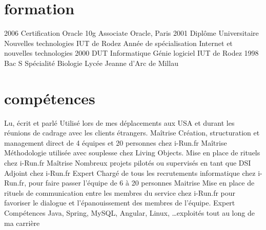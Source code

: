 \documentclass{friggeri-cv} 	%
\begin{document}
\section{formation}

\begin{entrylist}
\entry
{2006}
{Certification Oracle {\normalfont 10g Associate}}
{Oracle, Paris}
{}
\entry
{2001}
{Diplôme Universitaire {\normalfont Nouvelles technologies}}
{IUT de Rodez}
{Année de spécialisation Internet et nouvelles technologies}
\entry
{2000}
{DUT {\normalfont Informatique Génie logiciel}}
{IUT de Rodez}
{}
\entry
{1998}
{Bac S {\normalfont Spécialité Biologie}}
{Lycée Jeanne d’Arc de Millau}
{}
\end{entrylist}


\section{compétences}

\begin{capabilitize}
		{Lu, écrit et parlé}
		{Utilisé lors de mes déplacements aux USA et durant les réunions de cadrage avec les clients
		étrangers.}
		{Maîtrise}
		{Création, structuration et management direct de 4 équipes et 20 personnes chez i-Run.fr}
		{Maîtrise}
		{Méthodologie utilisée avec souplesse chez Living Objects. Mise en place de rituels chez i-Run.fr}
		{Maîtrise}
		{Nombreux projets pilotés ou supervisés en tant que DSI Adjoint chez i-Run.fr}
		{Expert}
		{Chargé de tous les recrutements informatique chez i-Run.fr, pour faire passer l’équipe de 6 à 20 personnes}
		{Maitrise}
		{Mise en place de rituels de communication entre les membres du service chez i-Run.fr pour favoriser le dialogue et l’épanouissement des membres de l’équipe.}
		{Expert}
		{Compétences Java, Spring, MySQL, Angular, Linux, \dots exploités tout au long de ma carrière}
\end{capabilitize}
\end{document}
